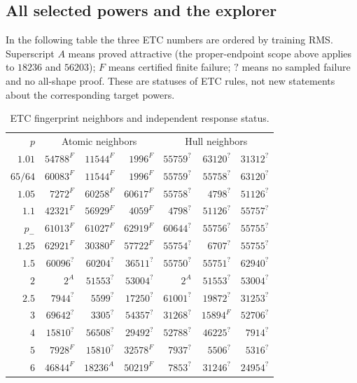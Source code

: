 \documentclass[11pt]{article}
\theoremstyle{definition}
\newcommand{\pn}{p_{-}}
\newcommand{\toprule}{\noalign{\hrule height 0.8pt\vskip4pt}}
\newcommand{\midrule}{\noalign{\vskip3pt\hrule height 0.4pt\vskip3pt}}
\begin{document}
\subsection{All selected powers and the explorer}
In the following table the three ETC numbers are ordered by training
RMS. Superscript $A$ means proved attractive (the proper-endpoint scope
above applies to $18236$ and $56203$); $F$ means certified finite failure;
$?$ means no sampled failure and no all-shape proof. These are statuses
of ETC rules, not new statements about the corresponding target powers.
\begin{table}[p]
\centering\small
\caption{ETC fingerprint neighbors and independent response status.}\label{tab:etc-neighbors}
\begin{tabular}{@{}r|rrr|rrr@{}}
\toprule $p$ & \multicolumn{3}{c|}{Atomic neighbors} & \multicolumn{3}{c}{Hull neighbors}\\\midrule
$1.01$ & $54788^{F}$ & $11544^{F}$ & $1996^{F}$ & $55759^{?}$ & $63120^{?}$ & $31312^{?}$\\
$65/64$ & $60083^{F}$ & $11544^{F}$ & $1996^{F}$ & $55759^{?}$ & $55758^{?}$ & $63120^{?}$\\
$1.05$ & $7272^{F}$ & $60258^{F}$ & $60617^{F}$ & $55758^{?}$ & $4798^{?}$ & $51126^{?}$\\
$1.1$ & $42321^{F}$ & $56929^{F}$ & $4059^{F}$ & $4798^{?}$ & $51126^{?}$ & $55757^{?}$\\
$\pn$ & $61013^{F}$ & $61027^{F}$ & $62919^{F}$ & $60644^{?}$ & $55756^{?}$ & $55755^{?}$\\
$1.25$ & $62921^{F}$ & $30380^{F}$ & $57722^{F}$ & $55754^{?}$ & $6707^{?}$ & $55755^{?}$\\
$1.5$ & $60096^{?}$ & $60204^{?}$ & $36511^{?}$ & $55750^{?}$ & $55751^{?}$ & $62940^{?}$\\
$2$ & $2^{A}$ & $51553^{?}$ & $53004^{?}$ & $2^{A}$ & $51553^{?}$ & $53004^{?}$\\
$2.5$ & $7944^{?}$ & $5599^{?}$ & $17250^{?}$ & $61001^{?}$ & $19872^{?}$ & $31253^{?}$\\
$3$ & $69642^{?}$ & $3305^{?}$ & $54357^{?}$ & $31268^{?}$ & $15894^{F}$ & $52706^{?}$\\
$4$ & $15810^{?}$ & $56508^{?}$ & $29492^{?}$ & $52788^{?}$ & $46225^{?}$ & $7914^{?}$\\
$5$ & $7928^{F}$ & $15810^{?}$ & $32578^{F}$ & $7937^{?}$ & $5506^{?}$ & $5316^{?}$\\
$6$ & $46844^{F}$ & $18236^{A}$ & $50219^{F}$ & $7853^{?}$ & $31246^{?}$ & $24954^{?}$\\

\end{tabular}
\end{table}
\end{document}
